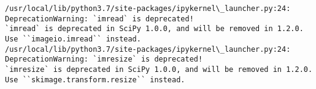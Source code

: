 \documentclass[11pt]{article}
\begin{document}
    \begin{Verbatim}[commandchars=\\\{\}]
/usr/local/lib/python3.7/site-packages/ipykernel\_launcher.py:24: DeprecationWarning: `imread` is deprecated!
`imread` is deprecated in SciPy 1.0.0, and will be removed in 1.2.0.
Use ``imageio.imread`` instead.
/usr/local/lib/python3.7/site-packages/ipykernel\_launcher.py:24: DeprecationWarning: `imresize` is deprecated!
`imresize` is deprecated in SciPy 1.0.0, and will be removed in 1.2.0.
Use ``skimage.transform.resize`` instead.

    \end{Verbatim}

    \begin{center}
    \end{center}
    { \hspace*{\fill} \\}
    
\end{document}
